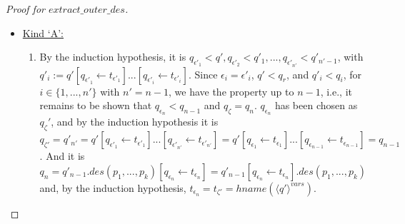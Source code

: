 \documentclass[11pt]{article} %
\begin{document}
\begin{proof}[Proof for $extract\_outer\_des$]
\begin{itemize}
\begin{itemize}
\begin{enumerate}
\begin{equation*}
\end{equation*}
contains no ``partially dead" equations. Only
\begin{equation*}
`` hname(\langle q' \rangle^{vars}).des(p_1, ..., p_k) = t_r "
\end{equation*}
remains to be considered. The only strict prefix of its left-hand side is $h := hname(\langle q' \rangle^{vars})$, that is, its function name isn't declared in $prg$. Consider an equation $r^*$ of $prg$. The equations of its transformation result $\langle r^* \rangle^e$ are $\epsilon^*_1, ..., \epsilon^*_n, \zeta^*$, with extraction function properties relative to $r^*$. This means that the function name of $q_{\epsilon^*_1}$ is declared in $prg$, unlike that of $h$, thus a term that matches it cannot match $h$. $h$ cannot match a term that matches $q_{\epsilon^*_i}$, for any $i \in \{2, ..., n\}$, because those are all destructor patterns. Finally, $h$ also cannot match a term that matches $q_{\zeta^*}$, because either (a) $\zeta^* = r^*$, and then $q_{\zeta^*}$ has a function name declared in $prg$, or (b) $q_{\zeta^*}$ is a destructor pattern.
\end{enumerate}

\item \underline{Kind `A':}
\begin{enumerate}
\item By the induction hypothesis, it is $q_{\epsilon'_1} < q', q_{\epsilon'_2} < q'_1, ..., q_{\epsilon'_{n'}} < q'_{n'-1}$, with $q'_i := q'[q_{\epsilon'_1} \leftarrow t_{\epsilon'_1}]...[q_{\epsilon'_i} \leftarrow t_{\epsilon'_i}]$. Since $\epsilon_i = \epsilon'_i$, $q' < q_r$, and $q'_i < q_i$, for $i \in \{1, ..., n'\}$ with $n' = n-1$, we have the property up to $n-1$, i.e., it remains to be shown that $q_{\epsilon_n} < q_{n-1}$ and $q_\zeta = q_n$. $q_{\epsilon_n}$ has been chosen as $q_\zeta'$, and by the induction hypothesis it is $q_{\zeta'} = q'_{n'} = q'[q_{\epsilon'_1} \leftarrow t_{\epsilon'_1}]...[q_{\epsilon'_{n'}} \leftarrow t_{\epsilon'_{n'}}] = q'[q_{\epsilon_1} \leftarrow t_{\epsilon_1}]...[q_{\epsilon_{n-1}} \leftarrow t_{\epsilon_{n-1}}] = q_{n-1}$. And it is $q_n = q'_{n-1}.des(p_1, ..., p_k)[q_{\epsilon_n} \leftarrow t_{\epsilon_n}] = q'_{n-1}[q_{\epsilon_n} \leftarrow t_{\epsilon_n}].des(p_1, ..., p_k)$ and, by the induction hypothesis, $t_{\epsilon_n} = t_{\zeta'} = hname(\langle q' \rangle^{vars})$.
\end{enumerate}


\end{itemize}
\end{itemize}
\end{proof}
\end{document}
